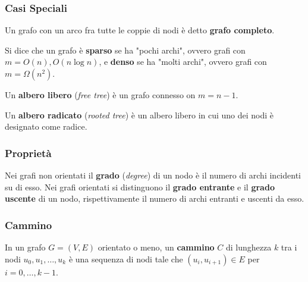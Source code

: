         \subsubsection{Casi Speciali}
            \begin{definition}
                Un grafo con un arco fra tutte le coppie di nodi è detto \textbf{grafo completo}.
            \end{definition}
            \begin{definition}
                Si dice che un grafo è \textbf{sparso} se ha "pochi archi", ovvero grafi con $m = O(n), O(n \log n)$, e \textbf{denso} se ha "molti archi", ovvero grafi con $m = \Omega(n^2)$.
            \end{definition}
            \begin{definition}
                Un \textbf{albero libero} (\textit{free tree}) è un grafo connesso on $ m = n-1$.
            \end{definition}
            \begin{definition}
                Un \textbf{albero radicato} (\textit{rooted tree}) è un albero libero in cui uno dei nodi è designato come radice.
            \end{definition}
        \subsubsection{Proprietà}
            \begin{definition}[Grado]
                Nei grafi non orientati il \textbf{grado} (\textit{degree}) di un nodo è il numero di archi incidenti su di esso.\newline
                Nei grafi orientati si distinguono il \textbf{grado entrante} e il \textbf{grado uscente} di un nodo, rispettivamente il numero di archi entranti e uscenti da esso.
            \end{definition}
        \subsubsection{Cammino}
            \begin{definition}[Cammino]
                In un grafo $ G=(V,E) $ orientato o meno, un \textbf{cammino} $C$ di lunghezza $k$ tra i nodi $u_0,u_1,\dots,u_k$ è una sequenza di nodi tale che $(u_i,u_{i+1}) \in E$ per $i=0,\dots,k-1$.
            \end{definition}
